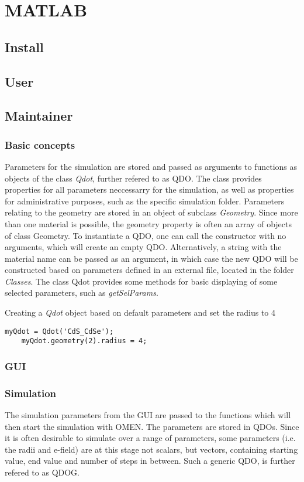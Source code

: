 \chapter{MATLAB}
\section{Install}
\section{User}
\section{Maintainer}
\subsection{Basic concepts}
Parameters for the simulation are stored and passed as arguments to functions as objects of the class \textit{Qdot}, further refered to as QDO. The class provides properties for all parameters neccessarry for the simulation, as well as properties for administrative purposes, such as the specific simulation folder. Parameters relating to the geometry are stored in an object of subclass \textit{Geometry}. Since more than one material is possible, the geometry property is often an array of objects of class Geometry. To instantiate a QDO, one can call the constructor with no arguments, which will create an empty QDO. Alternatively, a string with the material name can be passed as an argument, in which case the new QDO will be constructed based on parameters defined in an external file, located in the folder \textit{Classes}. The class Qdot provides some methods for basic displaying of some selected parameters, such as \textit{getSelParams}.\\

\begin{EXAMPLE}
Creating a \textit{Qdot} object based on default parameters and set the radius to 4
\begin{lstlisting}[frame=none]
	myQdot = Qdot('CdS_CdSe');
	myQdot.geometry(2).radius = 4;\end{lstlisting}
\end{EXAMPLE}
\subsection{GUI}
\subsection{Simulation}
The simulation parameters from the GUI are passed to the functions which will then start the simulation with OMEN. The parameters are stored in QDOs. Since it is often desirable to simulate over a range of parameters, some parameters (i.e. the radii and e-field) are at this stage not scalars, but vectors, containing starting value, end value and number of steps in between. Such a generic QDO,  is further refered to as QDOG.\\

